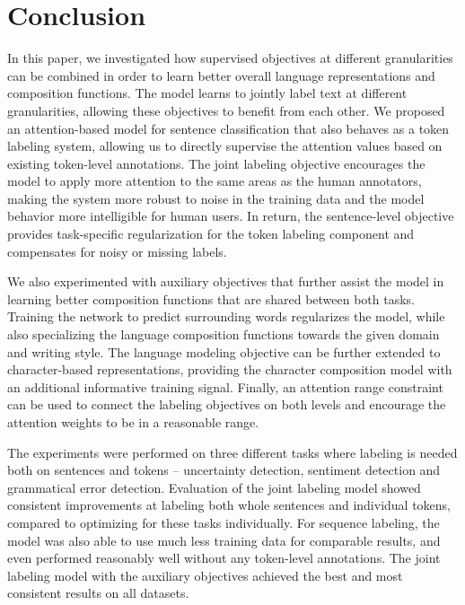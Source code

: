 \documentclass[letterpaper]{article} \usepackage{aaai19}  \usepackage{times}  \usepackage{helvet}  \usepackage{courier}  \usepackage{graphicx}
\begin{document}
\section{Conclusion}

In this paper, we investigated how supervised objectives at different granularities can be combined in order to learn better overall language representations and composition functions.
The model learns to jointly label text at different granularities, allowing these objectives to benefit from each other. 
We proposed an attention-based model for sentence classification that also behaves as a token labeling system, allowing us to directly supervise the attention values based on existing token-level annotations.
The joint labeling objective encourages the model to apply more attention to the same areas as the human annotators, making the system more robust to noise in the training data and the model behavior more intelligible for human users.
In return, the sentence-level objective provides task-specific regularization for the token labeling component and compensates for noisy or missing labels. 

We also experimented with auxiliary objectives that further assist the model in learning better composition functions that are shared between both tasks.
Training the network to predict surrounding words regularizes the model, while also specializing the language composition functions towards the given domain and writing style.
The language modeling objective can be further extended to character-based representations, providing the character composition model with an additional informative training signal.
Finally, an attention range constraint can be used to connect the labeling objectives on both levels and encourage the attention weights to be in a reasonable range.

The experiments were performed on three different tasks where labeling is needed both on sentences and tokens -- uncertainty detection, sentiment detection and grammatical error detection.
Evaluation of the joint labeling model  showed consistent improvements at labeling both whole sentences and individual tokens, compared to optimizing for these tasks individually. For sequence labeling, the model was also able to use much less training data for comparable results, and even performed reasonably well without any token-level annotations. The joint labeling model with the auxiliary objectives achieved the best and most consistent results on all datasets.



\end{document}
